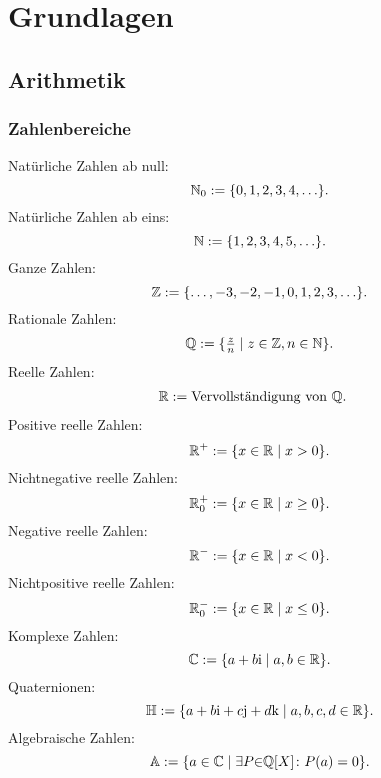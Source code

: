 
\chapter{Grundlagen}
\section{Arithmetik}
\subsection{Zahlenbereiche}
Natürliche Zahlen ab null:
\begin{equation}
\mathbb N_0 := \{0,1,2,3,4,\ldots\}.
\end{equation}
Natürliche Zahlen ab eins:
\begin{equation}
\mathbb N := \{1,2,3,4,5,\ldots\}.
\end{equation}
Ganze Zahlen:
\begin{equation}
\mathbb Z := \{\ldots,-3,-2,-1,0,1,2,3,\ldots\}.
\end{equation}
Rationale Zahlen:
\begin{equation}
\mathbb Q := \{\tfrac{z}{n}\mid z\in\mathbb Z,n\in\mathbb N\}.
\end{equation}
Reelle Zahlen:
\begin{equation}
\begin{split}
&\mathbb R := \text{Vervollständigung von }\mathbb Q.
\end{split}
\end{equation}
Positive reelle Zahlen:
\begin{equation}
\mathbb R^+ := \{x\in\mathbb R\mid x>0\}.
\end{equation}
Nichtnegative reelle Zahlen:
\begin{equation}
\mathbb R_0^+ := \{x\in\mathbb R\mid x\ge 0\}.
\end{equation}
Negative reelle Zahlen:
\begin{equation}
\mathbb R^- := \{x\in\mathbb R\mid x<0\}.
\end{equation}
Nichtpositive reelle Zahlen:
\begin{equation}
\mathbb R_0^- := \{x\in\mathbb R\mid x\le 0\}.
\end{equation}
Komplexe Zahlen:
\begin{equation}
\mathbb C := \{a+b\mathrm i\mid a,b\in\mathbb R\}.
\end{equation}
Quaternionen:
\begin{equation}
\mathbb H := \{a+b\mathrm i+c\mathrm j+d\mathrm k\mid a,b,c,d\in\mathbb R\}.
\end{equation}
Algebraische Zahlen:
\begin{equation}
\mathbb A := \{a\in\mathbb C\mid \exists P{\in}\mathbb Q[X]\colon P(a)=0\}.
\end{equation}
